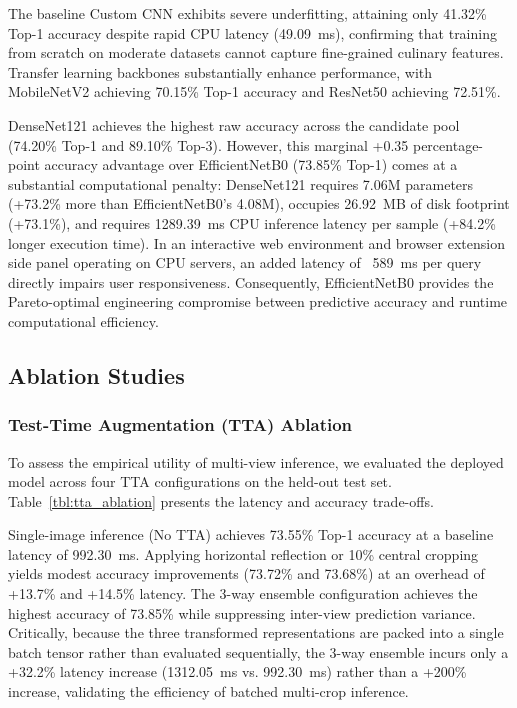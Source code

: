\documentclass[conference]{IEEEtran}
\begin{document}
The baseline Custom CNN exhibits severe underfitting, attaining only 41.32\% Top-1 accuracy despite rapid CPU latency (49.09~ms), confirming that training from scratch on moderate datasets cannot capture fine-grained culinary features. Transfer learning backbones substantially enhance performance, with MobileNetV2 achieving 70.15\% Top-1 accuracy and ResNet50 achieving 72.51\%.

DenseNet121 achieves the highest raw accuracy across the candidate pool (74.20\% Top-1 and 89.10\% Top-3). However, this marginal +0.35 percentage-point accuracy advantage over EfficientNetB0 (73.85\% Top-1) comes at a substantial computational penalty: DenseNet121 requires 7.06M parameters (+73.2\% more than EfficientNetB0's 4.08M), occupies 26.92~MB of disk footprint (+73.1\%), and requires 1289.39~ms CPU inference latency per sample (+84.2\% longer execution time). In an interactive web environment and browser extension side panel operating on CPU servers, an added latency of ~589~ms per query directly impairs user responsiveness. Consequently, EfficientNetB0 provides the Pareto-optimal engineering compromise between predictive accuracy and runtime computational efficiency.

\subsection{Ablation Studies}
\subsubsection{Test-Time Augmentation (TTA) Ablation}
To assess the empirical utility of multi-view inference, we evaluated the deployed model across four TTA configurations on the held-out test set. Table~\ref{tbl:tta_ablation} presents the latency and accuracy trade-offs.

{\setlength{\tabcolsep}{2.5pt}}

Single-image inference (No TTA) achieves 73.55\% Top-1 accuracy at a baseline latency of 992.30~ms. Applying horizontal reflection or 10\% central cropping yields modest accuracy improvements (73.72\% and 73.68\%) at an overhead of +13.7\% and +14.5\% latency. The 3-way ensemble configuration achieves the highest accuracy of 73.85\% while suppressing inter-view prediction variance. Critically, because the three transformed representations are packed into a single batch tensor rather than evaluated sequentially, the 3-way ensemble incurs only a +32.2\% latency increase (1312.05~ms vs. 992.30~ms) rather than a +200\% increase, validating the efficiency of batched multi-crop inference.
\end{document}
